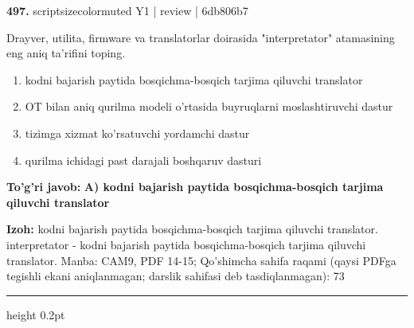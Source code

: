 \documentclass[10pt,a4paper]{article}
\begin{document}
{\bfseries\sffamily\color{ink} 497.} {scriptsizecolor{muted} Y1 | review | 6db806b7}
\par
Drayver, utilita, firmware va translatorlar doirasida "interpretator" atamasining eng aniq ta'rifini toping.
\begin{enumerate}[label=\Alph*),leftmargin=9mm]
\item kodni bajarish paytida bosqichma-bosqich tarjima qiluvchi translator
\item OT bilan aniq qurilma modeli o'rtasida buyruqlarni moslashtiruvchi dastur
\item tizimga xizmat ko'rsatuvchi yordamchi dastur
\item qurilma ichidagi past darajali boshqaruv dasturi
\end{enumerate}
\begin{tcolorbox}[enhanced,breakable,colback=teal!4,colframe=teal!60!black,boxrule=0.45pt,arc=1.2mm,left=2.7mm,right=2.7mm,top=1.8mm,bottom=1.8mm,before skip=2mm,after skip=2mm]
{\bfseries\sffamily\color{teal}To'g'ri javob:} \textbf{A) kodni bajarish paytida bosqichma-bosqich tarjima qiluvchi translator}
\par\smallskip
{\bfseries Izoh:} kodni bajarish paytida bosqichma-bosqich tarjima qiluvchi translator. interpretator - kodni bajarish paytida bosqichma-bosqich tarjima qiluvchi translator. Manba: CAM9, PDF 14-15; Qo'shimcha sahifa raqami (qaysi PDFga tegishli ekani aniqlanmagan; darslik sahifasi deb tasdiqlanmagan): 73
\end{tcolorbox}
\vspace{2mm}\hrule height 0.2pt\vspace{3mm}
\end{document}
